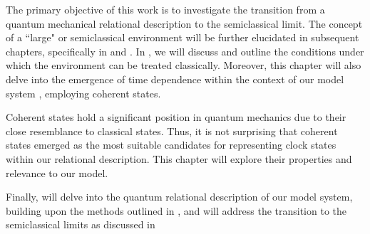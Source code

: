The primary objective of this work is to investigate the transition from a quantum mechanical 
relational description to the semiclassical limit. The concept of a ``large" or semiclassical 
environment will be further elucidated in subsequent chapters, specifically in 
 and . 
In , we will discuss and outline the conditions 
under which the environment can be treated classically. Moreover, this chapter will 
also delve into the emergence of time dependence within the context of our model system
, employing coherent states.

Coherent states hold a significant position in quantum mechanics due to their close 
resemblance to classical states. Thus, it is not surprising that coherent states 
emerged as the most suitable candidates for representing clock states within our 
relational description. This chapter will explore their properties and relevance 
to our model.

Finally,  will delve into the quantum relational 
description of our model system, building upon the methods outlined in 
, and will address the transition to the semiclassical 
limits as discussed in 

\newpage